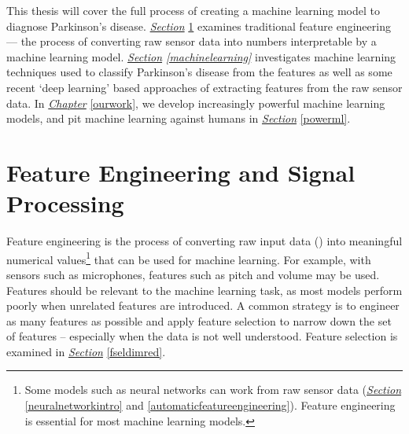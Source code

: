\documentclass[12pt, twoside]{book}
\renewcommand\emph[1]{\textit{\color{USred}{#1}}}
\begin{document}

This thesis will cover the full process of creating a machine learning model to diagnose Parkinson's disease. \textit{\hyperref[featureengineeringsigprocs]{Section}} \ref{featureengineeringsigprocs} examines traditional feature engineering --- the process of converting raw sensor data into numbers interpretable by a machine learning model. \textit{\hyperref[machinelearning]{Section} \ref{machinelearning}} investigates machine learning techniques used to classify Parkinson's disease from the features as well as some recent `deep learning' based approaches of extracting features from the raw sensor data. In \textit{\hyperref[ourwork]{Chapter}} \ref{ourwork}, we develop increasingly powerful machine learning models, and pit machine learning against humans in \textit{\hyperref[powerml]{Section}} \ref{powerml}.

\section{Feature Engineering and Signal Processing}
\label{featureengineeringsigprocs}
Feature engineering is the process of converting raw input data (\emph{signals}) into meaningful numerical values\footnote{Some models such as neural networks can work from raw sensor data (\textit{\hyperref[neuralnetworkintro]{Section}} \ref{neuralnetworkintro} and \ref{automaticfeatureengineering}). Feature engineering is essential for most machine learning models.} that can be used for machine learning. For example, with sensors such as microphones, features such as pitch and volume may be used. Features should be relevant to the machine learning task, as most models perform poorly when unrelated features are introduced. A common strategy is to engineer as many features as possible and apply feature selection to narrow down the set of features -- especially when the data is not well understood. Feature selection is examined in \textit{\hyperref[fseldimred]{Section}} \ref{fseldimred}. 
\end{document}
